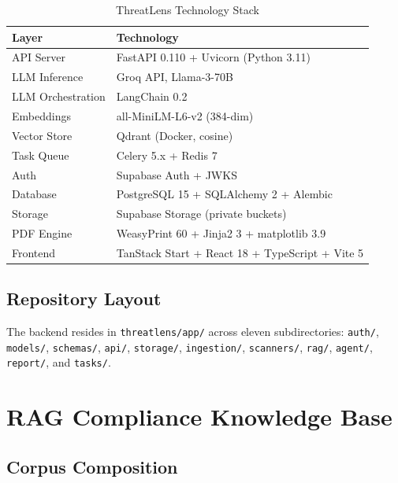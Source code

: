\documentclass[conference]{IEEEtran}
\begin{document}
\begin{table}[htbp]
\centering
\caption{ThreatLens Technology Stack}
\label{tab:stack}
\scriptsize
\begin{tabular}{@{}ll@{}}
\toprule
\textbf{Layer} & \textbf{Technology} \\
\midrule
API Server        & FastAPI 0.110 + Uvicorn (Python 3.11) \\
LLM Inference     & Groq API, Llama-3-70B \\
LLM Orchestration & LangChain 0.2 \\
Embeddings        & all-MiniLM-L6-v2 (384-dim) \\
Vector Store      & Qdrant (Docker, cosine) \\
Task Queue        & Celery 5.x + Redis 7 \\
Auth              & Supabase Auth + JWKS \\
Database          & PostgreSQL 15 + SQLAlchemy 2 + Alembic \\
Storage           & Supabase Storage (private buckets) \\
PDF Engine        & WeasyPrint 60 + Jinja2 3 + matplotlib 3.9 \\
Frontend          & TanStack Start + React 18 + TypeScript + Vite 5 \\
\bottomrule
\end{tabular}
\end{table}

\subsection{Repository Layout}
The backend resides in \texttt{threatlens/app/} across eleven
subdirectories: \texttt{auth/}, \texttt{models/}, \texttt{schemas/},
\texttt{api/}, \texttt{storage/}, \texttt{ingestion/}, \texttt{scanners/},
\texttt{rag/}, \texttt{agent/}, \texttt{report/}, and \texttt{tasks/}.

\section{RAG Compliance Knowledge Base}
\label{sec:rag}

\subsection{Corpus Composition}
\end{document}
